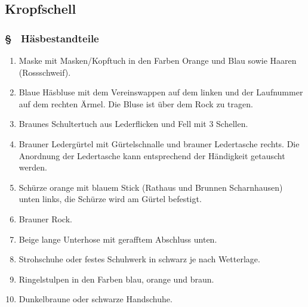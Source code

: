 \subsection{Kropfschell}
\subsubsection{§ \thehoparagraphcounter\ Häsbestandteile} \label{ho:par:haesbestandteile_kropfschell}
\begin{enumerate}
    \item \label{ho:abs:t7jg3a} Maske mit Masken/Kopftuch in den Farben Orange und Blau sowie Haaren (Rossschweif).
    
    \item \label{ho:abs:2b9q74} Blaue Häsbluse mit dem Vereinswappen auf dem linken und der Laufnummer auf dem rechten Ärmel. Die Bluse ist über dem Rock zu tragen.
    
    \item \label{ho:abs:zgvky5} Braunes Schultertuch aus Lederflicken und Fell mit 3 Schellen.
    
    \item \label{ho:abs:tpggdh} Brauner Ledergürtel mit Gürtelschnalle und brauner Ledertasche rechts. Die Anordnung der Ledertasche kann entsprechend der Händigkeit getauscht werden.
    
    \item \label{ho:abs:jgzx1o} Schürze orange mit blauem Stick (Rathaus und Brunnen Scharnhausen) unten links, die Schürze wird am Gürtel befestigt.
    
    \item \label{ho:abs:l5bg0n} Brauner Rock.
    
    \item \label{ho:abs:p4x190} Beige lange Unterhose mit gerafftem Abschluss unten.
    
    \item \label{ho:abs:6rntav} Strohschuhe oder festes Schuhwerk in schwarz je nach Wetterlage.
    
    \item \label{ho:abs:vg8264} Ringelstulpen in den Farben blau, orange und braun.
    
    \item \label{ho:abs:zgdcbj} Dunkelbraune oder schwarze Handschuhe.
\end{enumerate}

